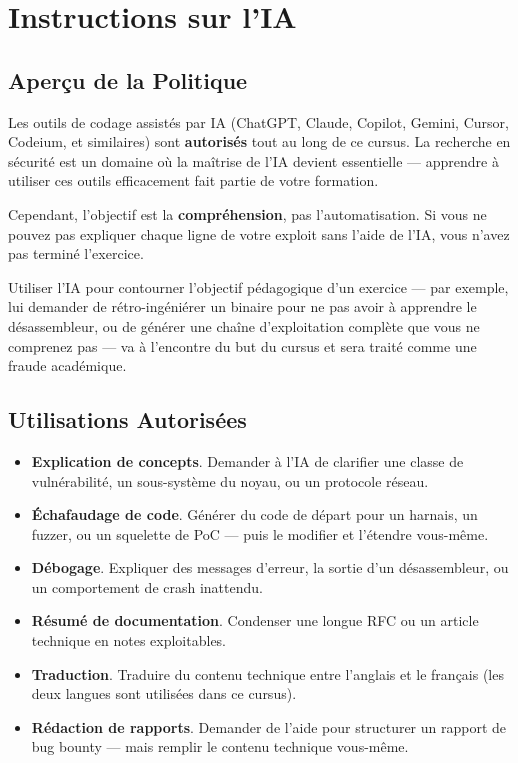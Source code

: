 \chapter{Instructions sur l'IA}

\section{Aperçu de la Politique}

Les outils de codage assistés par IA (ChatGPT, Claude, Copilot, Gemini,
Cursor, Codeium, et similaires) sont \textbf{autorisés} tout au long
de ce cursus. La recherche en sécurité est un domaine où la maîtrise
de l'IA devient essentielle --- apprendre à utiliser ces outils
efficacement fait partie de votre formation.

Cependant, l'objectif est la \textbf{compréhension}, pas l'automatisation.
Si vous ne pouvez pas expliquer chaque ligne de votre exploit sans
l'aide de l'IA, vous n'avez pas terminé l'exercice.

\begin{warning}
  Utiliser l'IA pour contourner l'objectif pédagogique d'un exercice
  --- par exemple, lui demander de rétro-ingéniérer un binaire pour
  ne pas avoir à apprendre le désassembleur, ou de générer une chaîne
  d'exploitation complète que vous ne comprenez pas --- va à l'encontre
  du but du cursus et sera traité comme une fraude académique.
\end{warning}

\section{Utilisations Autorisées}

\begin{itemize}
  \item \textbf{Explication de concepts}. Demander à l'IA de clarifier
        une classe de vulnérabilité, un sous-système du noyau, ou un
        protocole réseau.
  \item \textbf{Échafaudage de code}. Générer du code de départ pour
        un harnais, un fuzzer, ou un squelette de PoC --- puis le
        modifier et l'étendre vous-même.
  \item \textbf{Débogage}. Expliquer des messages d'erreur, la sortie
        d'un désassembleur, ou un comportement de crash inattendu.
  \item \textbf{Résumé de documentation}. Condenser une longue RFC ou
        un article technique en notes exploitables.
  \item \textbf{Traduction}. Traduire du contenu technique entre
        l'anglais et le français (les deux langues sont utilisées
        dans ce cursus).
  \item \textbf{Rédaction de rapports}. Demander de l'aide pour
        structurer un rapport de bug bounty --- mais remplir le
        contenu technique vous-même.
\end{itemize}

